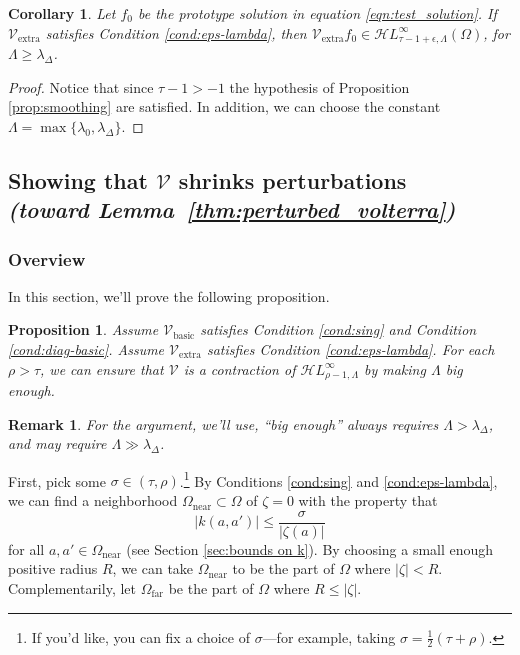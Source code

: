 \documentclass{article}
\theoremstyle{plain}
\newtheorem{prop}{Proposition}
\newtheorem{rmk}{Remark}
\newtheorem{cor}{Corollary}
\newcommand{\singexp}[2]{\mathcal{H}L^\infty_{#1, #2}}
\newcommand{\volterra}{\mathcal{V}}
\newcommand{\hardpart}{\mathcal{V}_\text{basic}}
\newcommand{\softpart}{\mathcal{V}_\text{extra}}
\newcommand{\domain}{\Omega}
\newcommand{\near}{\Omega_\text{near}}
\newcommand{\far}{\Omega_\text{far}}
\begin{document}
\begin{cor}\label{cor:pertub_f0}
    Let $f_0$ be the prototype solution in equation \eqref{eqn:test_solution}. If $\softpart$ satisfies {\em Condition \eqref{cond:eps-lambda}}, then $\softpart f_0\in\singexp{\tau-1+\epsilon}{\Lambda}(\Omega)$, for $\Lambda\geq \lambda_\Delta$. 
\end{cor}
\begin{proof}
    Notice that since $\tau-1>-1$ the hypothesis of Proposition \ref{prop:smoothing} are satisfied. In addition, we can choose the constant $\Lambda=\max \{\lambda_0 , \lambda_\Delta\}$. 
\end{proof}

\subsection{Showing that $\volterra$ shrinks perturbations \\ \textit{(toward Lemma~\ref{thm:perturbed_volterra})}}\label{sec:V is a contraction}
\subsubsection{Overview}
In this section, we'll prove the following proposition. %

\begin{prop}\label{prop:get-contraction}
Assume $\hardpart$ satisfies {\em Condition \eqref{cond:sing}} and {\em Condition \eqref{cond:diag-basic}}. Assume $\softpart$ satisfies {\em Condition \eqref{cond:eps-lambda}}. For each $\rho > \tau$, we can ensure that $\volterra$ is a contraction of $\singexp{\rho-1}{\Lambda}$ by making $\Lambda$ big enough.
\end{prop}
\begin{rmk}
For the argument, we'll use, ``big enough'' always requires $\Lambda > \lambda_\Delta$, and may require $\Lambda \gg \lambda_\Delta$.
\end{rmk}
First, pick some $\sigma \in (\tau, \rho)$.\footnote{If you'd like, you can fix a choice of $\sigma$---for example, taking $\sigma = \frac{1}{2}(\tau + \rho)$.} By Conditions \eqref{cond:sing} and \eqref{cond:eps-lambda}, we can find a neighborhood $\near \subset \domain$ of $\zeta = 0$ with the property that
\begin{equation}\label{near-limit}
|k(a, a')| \le \frac{\sigma}{|\zeta(a)|}
\end{equation}
for all $a, a' \in \near$ (see Section \ref{sec:bounds on k}). By choosing a small enough positive radius $R$, we can take $\near$ to be the part of $\domain$ where $|\zeta| < R$. Complementarily, let $\far$ be the part of $\domain$ where $R \le |\zeta|$.
\end{document}

